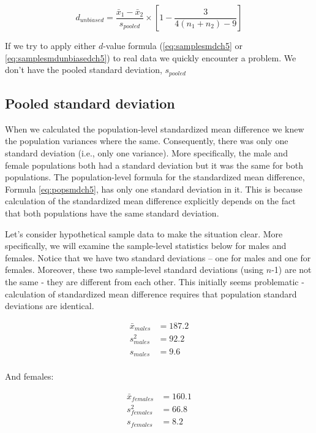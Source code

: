 \documentclass[
]{krantz}
\begin{document}
\begin{equation} 
d_{unbiased}  = \frac{\bar{x}_{1} - \bar{x}_{2}}{s_{pooled}} \times [1 - \frac{3}{4(n_1 + n_2)-9}]
      \label{eq:samplesmdunbiasedch5}
\end{equation}

If we try to apply either \(d\)-value formula (\eqref{eq:samplesmdch5} or \eqref{eq:samplesmdunbiasedch5}) to real data we quickly encounter a problem. We don't have the pooled standard deviation, \(s_{pooled}\)

\hypertarget{pooled-standard-deviation}{%
\subsection{Pooled standard deviation}\label{pooled-standard-deviation}}

When we calculated the population-level standardized mean difference we knew the population variances where the same. Consequently, there was only one standard deviation (i.e., only one variance). More specifically, the male and female populations both had a standard deviation but it was the same for both populations. The population-level formula for the standardized mean difference, Formula \eqref{eq:popsmdch5}, has only one standard deviation in it. This is because calculation of the standardized mean difference explicitly depends on the fact that both populations have the same standard deviation.

Let's consider hypothetical sample data to make the situation clear. More specifically, we will examine the sample-level statistics below for males and females. Notice that we have two standard deviations -- one for males and one for females. Moreover, these two sample-level standard deviations (using \(n\)-1) are not the same - they are different from each other. This initially seems problematic - calculation of standardized mean difference requires that population standard deviations are identical.

\[
\begin{aligned} 
\bar{x}_{males} &= 187.2 \\
s_{males}^2 &= 92.2 \\
s_{males} &= 9.6 \\
\end{aligned} 
\]

And females:

\[
\begin{aligned} 
\bar{x}_{females} &= 160.1 \\
s_{females}^2 &= 66.8 \\
s_{females} &= 8.2 \\
\end{aligned} 
\]
\end{document}

